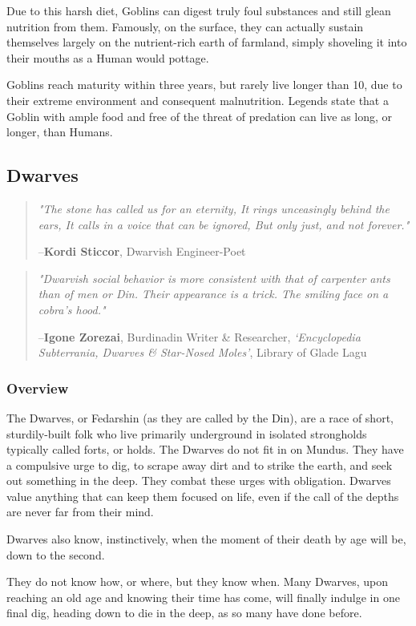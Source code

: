 \documentclass[oneside,11pt,english]{book}
\begin{document}
Due to this harsh diet, Goblins can digest truly foul substances and still glean nutrition from them. 
Famously, on the surface, they can actually sustain themselves largely on the nutrient-rich earth of 
farmland, simply shoveling it into their mouths as a Human would pottage. 


Goblins reach maturity within three years, but rarely live longer than 10, due to their extreme 
environment and consequent malnutrition. Legends state that a Goblin with ample food and free of the 
threat of predation can live as long, or longer, than Humans. 
\subsection{Dwarves}\label{sec:dwarves}
\begin{quotation}
  \emph{"The stone has called us for an eternity,	It rings unceasingly behind the ears, 	It calls in a voice that can be ignored, 	But only just, and not forever."}

  \hfill--\textbf{Kordi Sticcor}, Dwarvish Engineer-Poet 
\end{quotation}
\begin{quotation}
  \emph{"Dwarvish social behavior is more consistent with that of carpenter ants than of men or Din. Their appearance is a trick. The smiling face on a cobra's hood."}

  \hfill--\textbf{Igone Zorezai}, Burdinadin Writer \& Researcher, \textit{‘Encyclopedia Subterrania, Dwarves \& Star-Nosed Moles’}, Library of Glade Lagu 
\end{quotation}
\subsubsection*{Overview} 
The Dwarves, or Fedarshin (as they are called by the Din), are a race of short, sturdily-built folk who live 
primarily underground in isolated strongholds typically called forts, or holds. The Dwarves do not fit in 
on Mundus. They have a compulsive urge to dig, to scrape away dirt and to strike the earth, and seek out 
something in the deep. They combat these urges with obligation. Dwarves value anything that can keep 
them focused on life, even if the call of the depths are never far from their mind. 


Dwarves also know, instinctively, when the moment of their death by age will be, down to the second. 


They do not know how, or where, but they know when. Many Dwarves, upon reaching an old age and 
knowing their time has come, will finally indulge in one final dig, heading down to die in the deep, as so 
many have done before. 
\end{document}
